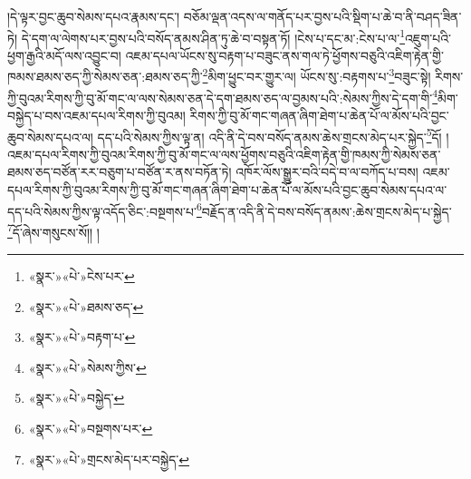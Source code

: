 །དེ་ལྟར་བྱང་ཆུབ་སེམས་དཔའ་རྣམས་དང་། བཅོམ་ལྡན་འདས་ལ་གནོད་པར་བྱས་པའི་སྡིག་པ་ཆེ་བ་ནི་བཤད་ཟིན་ཏེ། དེ་དག་ལ་ལེགས་པར་བྱས་པའི་བསོད་ནམས་ཤིན་ཏུ་ཆེ་བ་བསྟན་ཏོ། །ངེས་པ་དང་མ་:ངེས་པ་ལ་\footnote{«སྣར་»«པེ་»ངེས་པར་}འཇུག་པའི་ཕྱག་རྒྱའི་མདོ་ལས་འབྱུང་བ། འཇམ་དཔལ་ཡོངས་སུ་བརྟག་པ་བཟུང་ནས་གལ་ཏེ་ཕྱོགས་བཅུའི་འཇིག་རྟེན་གྱི་ཁམས་ཐམས་ཅད་ཀྱི་སེམས་ཅན་:ཐམས་ཅད་ཀྱི་\footnote{«སྣར་»«པེ་»ཐམས་ཅད་}མིག་ཕྱུང་བར་གྱུར་ལ། ཡོངས་སུ་:བརྟགས་པ་\footnote{«སྣར་»«པེ་»བརྟག་པ་}བཟུང་སྟེ། རིགས་ཀྱི་བུའམ་རིགས་ཀྱི་བུ་མོ་གང་ལ་ལས་སེམས་ཅན་དེ་དག་ཐམས་ཅད་ལ་བྱམས་པའི་:སེམས་ཀྱིས་དེ་དག་གི་\footnote{«སྣར་»«པེ་»སེམས་ཀྱིས་}མིག་བསྐྱེད་པ་བས་འཇམ་དཔལ་རིགས་ཀྱི་བུའམ། རིགས་ཀྱི་བུ་མོ་གང་གཞན་ཞིག་ཐེག་པ་ཆེན་པོ་ལ་མོས་པའི་བྱང་ཆུབ་སེམས་དཔའ་ལ། དད་པའི་སེམས་ཀྱིས་ལྟ་ན། འདི་ནི་དེ་བས་བསོད་ནམས་ཆེས་གྲངས་མེད་པར་སྐྱེད་\footnote{«སྣར་»«པེ་»བསྐྱེད་}དོ། །འཇམ་དཔལ་རིགས་ཀྱི་བུའམ་རིགས་ཀྱི་བུ་མོ་གང་ལ་ལས་ཕྱོགས་བཅུའི་འཇིག་རྟེན་གྱི་ཁམས་ཀྱི་སེམས་ཅན་ཐམས་ཅད་བཙོན་རར་བཅུག་པ་བཙོན་ར་ནས་བཏོན་ཏེ། འཁོར་ལོས་སྒྱུར་བའི་བདེ་བ་ལ་བཀོད་པ་བས། འཇམ་དཔལ་རིགས་ཀྱི་བུའམ་རིགས་ཀྱི་བུ་མོ་གང་གཞན་ཞིག་ཐེག་པ་ཆེན་པོ་ལ་མོས་པའི་བྱང་ཆུབ་སེམས་དཔའ་ལ་དད་པའི་སེམས་ཀྱིས་ལྟ་འདོད་ཅིང་:བསྔགས་པ་\footnote{«སྣར་»«པེ་»བསྔགས་པར་}བརྗོད་ན་འདི་ནི་དེ་བས་བསོད་ནམས་:ཆེས་གྲངས་མེད་པ་སྐྱེད་\footnote{«སྣར་»«པེ་»གྲངས་མེད་པར་བསྐྱེད་}དོ་ཞེས་གསུངས་སོ།། །
